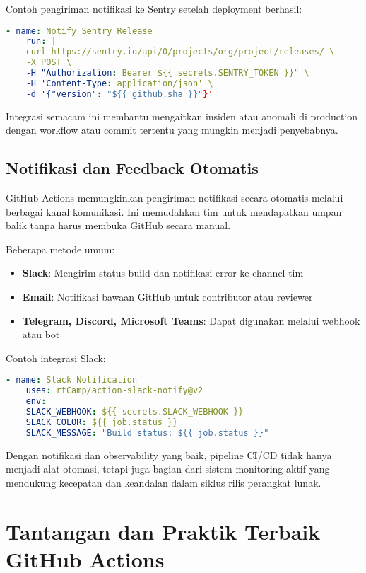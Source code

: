 Contoh pengiriman notifikasi ke Sentry setelah deployment berhasil:
\begin{lstlisting}[language=yaml, caption={Integrasi Monitoring Eksternal}]
	- name: Notify Sentry Release
	run: |
	curl https://sentry.io/api/0/projects/org/project/releases/ \
	-X POST \
	-H "Authorization: Bearer ${{ secrets.SENTRY_TOKEN }}" \
	-H 'Content-Type: application/json' \
	-d '{"version": "${{ github.sha }}"}'
\end{lstlisting}

Integrasi semacam ini membantu mengaitkan insiden atau anomali di production dengan workflow atau commit tertentu yang mungkin menjadi penyebabnya.

\subsection{Notifikasi dan Feedback Otomatis}

GitHub Actions memungkinkan pengiriman notifikasi secara otomatis melalui berbagai kanal komunikasi. Ini memudahkan tim untuk mendapatkan umpan balik tanpa harus membuka GitHub secara manual.

Beberapa metode umum:
\begin{itemize}
	\item \textbf{Slack}: Mengirim status build dan notifikasi error ke channel tim
	\item \textbf{Email}: Notifikasi bawaan GitHub untuk contributor atau reviewer
	\item \textbf{Telegram, Discord, Microsoft Teams}: Dapat digunakan melalui webhook atau bot
\end{itemize}

Contoh integrasi Slack:
\begin{lstlisting}[language=yaml, caption={Notifikasi Slack dengan Webhook}]
	- name: Slack Notification
	uses: rtCamp/action-slack-notify@v2
	env:
	SLACK_WEBHOOK: ${{ secrets.SLACK_WEBHOOK }}
	SLACK_COLOR: ${{ job.status }}
	SLACK_MESSAGE: "Build status: ${{ job.status }}"
\end{lstlisting}

Dengan notifikasi dan observability yang baik, pipeline CI/CD tidak hanya menjadi alat otomasi, tetapi juga bagian dari sistem monitoring aktif yang mendukung kecepatan dan keandalan dalam siklus rilis perangkat lunak.

\section{Tantangan dan Praktik Terbaik GitHub Actions}

